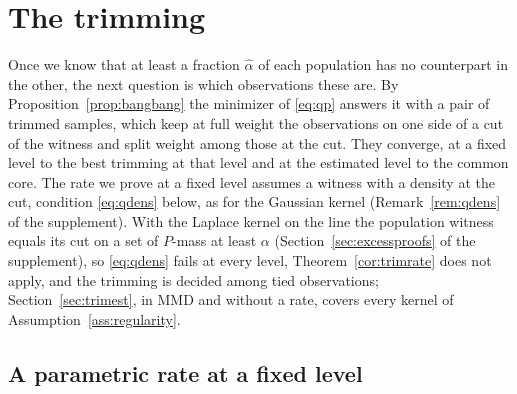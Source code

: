\section{The trimming}
\label{sec:trimming}

Once we know that at least a fraction $\widehat\alpha$ of each population has no counterpart in the other, the next
question is which observations these are. By Proposition~\ref{prop:bangbang} the minimizer of \eqref{eq:qp} answers it
with a pair of trimmed samples, which keep at full weight the observations on one side of a cut of the witness and split
weight among those at the cut. They converge, at a fixed level to the best trimming at that level and at the estimated
level to the common core. The rate we prove at a fixed level assumes a witness with a density at the cut, condition
\eqref{eq:qdens} below, as for the Gaussian kernel (Remark~\ref{rem:qdens} of the supplement). With the Laplace kernel
on the line the population witness equals its cut on a set of $P$-mass at least $\alpha$ (Section~\ref{sec:excessproofs}
of the supplement), so \eqref{eq:qdens} fails at every level, Theorem~\ref{cor:trimrate} does not apply, and the
trimming is decided among tied observations; Section~\ref{sec:trimest}, in MMD and without a rate, covers every kernel
of Assumption~\ref{ass:regularity}.

\subsection{A parametric rate at a fixed level}

